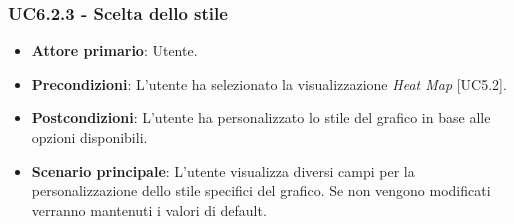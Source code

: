 \subsubsection{UC6.2.3 - Scelta dello stile}
\begin{itemize}
	\item \textbf{Attore primario}: Utente.
	\item \textbf{Precondizioni}: L'utente ha selezionato la visualizzazione \textit{Heat Map} [UC5.2].
	\item \textbf{Postcondizioni}: L'utente ha personalizzato lo stile del grafico in base alle opzioni disponibili. 
	
	\item \textbf{Scenario principale}: L'utente visualizza diversi campi per la personalizzazione dello stile specifici del grafico. Se non vengono modificati verranno mantenuti i valori di default. 
\end{itemize}